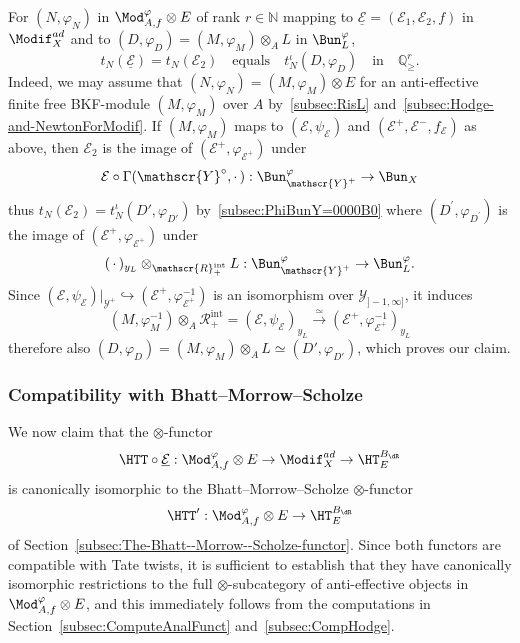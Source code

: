 For $(N,\varphi_{N})$ in $\Mod_{A,f}^{\varphi}\otimes E$ of rank $r\in\mathbb{N}$ mapping to $\underline{\mathcal{E}}=(\mathcal{E}_{1},\mathcal{E}_{2},f)$ in $\Modif_{X}^{ad}$ and to $(D,\varphi_{D})=(M,\varphi_{M})\otimes_{A}L$ in $\Bun_{L}^{\varphi}$,
\[
t_{N}(\underline{\mathcal{E}})=t_{N}(\mathcal{E}_{2})\quad\text{equals}\quad t_{N}^{\iota}(D,\varphi_{D})\quad\text{in}\quad\mathbb{Q}_{\geq}^{r}.
\]
Indeed, we may assume that $(N,\varphi_{N})=(M,\varphi_{M})\otimes E$ for an anti-effective finite free BKF-module $(M,\varphi_{M})$ over $A$ by~\ref{subsec:RisL} and~\ref{subsec:Hodge-and-NewtonForModif}. If $(M,\varphi_{M})$ maps to $(\mathscr{E},\psi_{\mathscr{E}})$ and $(\mathscr{E}^{+},\mathscr{E}^{-},f_{\mathscr{E}})$ as above, then $\mathcal{E}_{2}$ is the image of $(\mathscr{E}^{+},\varphi_{\mathscr{E}^{+}})$ under
\[
\mathcal{E}\circ\Gamma(\mathscr{Y}^{\circ},{\cdot\,}):\Bun_{\mathscr{Y}^{+}}^{\varphi}\rightarrow\Bun_{X}
\]
thus $t_{N}(\mathcal{E}_{2})=t_{N}^{\iota}(D',\varphi_{D'})$ by~\ref{subsec:PhiBunY=0000B0} where $(D^{\prime},\varphi_{D^{\prime}})$ is the image of $(\mathscr{E}^{+},\varphi_{\mathscr{E}^{+}})$ under
\[
({\,\cdot\,})_{y_{L}}\otimes_{\mathscr{R}_{+}^{\mathrm{int}}}L:\Bun_{\mathscr{Y}^{+}}^{\varphi}\rightarrow\Bun_{L}^{\varphi}.
\]
Since $(\mathscr{E},\psi_{\mathscr{E}})\vert_{\mathscr{Y}^{+}}\hookrightarrow(\mathscr{E}^{+},\varphi_{\mathscr{E}^{+}}^{-1})$ is an isomorphism over $\mathscr{Y}_{]-1,\infty]}$, it induces
\[
(M,\varphi_{M}^{-1})\otimes_{A}\mathscr{R}_{+}^{\mathrm{int}}=(\mathscr{E},\psi_{\mathscr{E}})_{y_{L}}\stackrel{\simeq}{\longrightarrow}(\mathscr{E}^{+},\varphi_{\mathscr{E}^{+}}^{-1})_{y_{L}}
\]
therefore also $(D,\varphi_{D})=(M,\varphi_{M})\otimes_{A}L\simeq(D',\varphi_{D'})$, which proves our claim.

\subsubsection{Compatibility with Bhatt--Morrow--Scholze}\label{subsec:CompScholzeFargues}

We now claim that the $\otimes$-functor
\[
\HTT\circ\underline{\mathcal{E}}:\Mod_{A,f}^{\varphi}\otimes E\rightarrow\Modif_{X}^{ad}\rightarrow\HT_{E}^{B_{\dR}}
\]
is canonically isomorphic to the Bhatt--Morrow--Scholze $\otimes$-functor
\[
\HTT':\Mod_{A,f}^{\varphi}\otimes E\rightarrow\HT_{E}^{B_{\dR}}
\]
of Section~\ref{subsec:The-Bhatt--Morrow--Scholze-functor}. Since both functors are compatible with Tate twists, it is sufficient to establish that they have canonically isomorphic restrictions to the full $\otimes$-subcategory of anti-effective objects in $\Mod_{A,f}^{\varphi}\otimes E$, and this immediately follows from the computations in Section~\ref{subsec:ComputeAnalFunct} and~\ref{subsec:CompHodge}.

